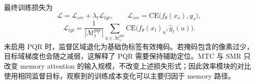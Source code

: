 最终训练损失为
\[
\mathcal{L}=\mathcal{L}_{src}+\lambda_t\mathcal{L}_{tgt},
\qquad
\mathcal{L}_{src}=\mathrm{CE}\big(f_{\theta}(x_s),y_s\big),
\]
\[
\mathcal{L}_{tgt}
=
\frac{1}{|\mathcal{M}^{pqr}_t|}
\sum_{u\in\mathcal{M}^{pqr}_t}
\mathrm{CE}\big(f_{\theta}(x_t)_u,\hat{y}_t(u)\big).
\]
未启用 PQR 时，监督区域退化为基础伪标签有效掩码。若掩码包含的像素过少，目标域梯度也会随之减弱，这解释了 PQR 需要保持辅助定位。MTC 与 SMR 只改变 memory attention 的输入规模，不改变上述损失形式；因此效率模块的对比使用相同监督目标，观察到的训练成本变化可以主要归因于 memory 路径。
